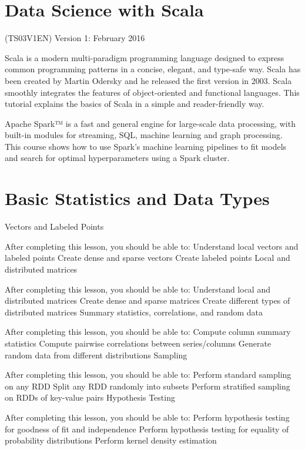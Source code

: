 

\section{Data Science with Scala}

(TS03V1EN) Version 1: February 2016

 
Scala is a modern multi-paradigm programming language designed to express common programming patterns in a concise, elegant, and type-safe way. Scala has been created by Martin Odersky and he released the first version in 2003. Scala smoothly integrates the features of object-oriented and functional languages. This tutorial explains the basics of Scala in a simple and reader-friendly way.
 

Apache Spark™ is a fast and general engine for large-scale data processing, with built-in modules for streaming, SQL, machine learning and graph processing. This course shows how to use Spark’s machine learning pipelines to fit models and search for optimal hyperparameters using a Spark cluster.
 


\section{Basic Statistics and Data Types}
 

Vectors and Labeled Points

After completing this lesson, you should be able to:
Understand local vectors and labeled points
Create dense and sparse vectors
Create labeled points
Local and distributed matrices

After completing this lesson, you should be able to:
Understand local and distributed matrices
Create dense and sparse matrices
Create different types of distributed matrices
Summary statistics, correlations, and random data

After completing this lesson, you should be able to:
Compute column summary statistics
Compute pairwise correlations between series/columns
Generate random data from different distributions
Sampling

After completing this lesson, you should be able to:
Perform standard sampling on any RDD
Split any RDD randomly into subsets
Perform stratified sampling on RDDs of key-value pairs
Hypothesis Testing

After completing this lesson, you should be able to:
Perform hypothesis testing for goodness of fit and independence
Perform hypothesis testing for equality of probability distributions
Perform kernel density estimation
 

